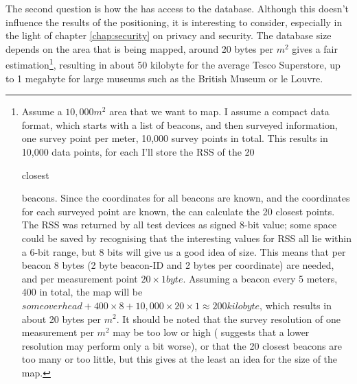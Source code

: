 The second question is how the \device has access to the database.
Although this doesn't influence the results of the positioning, it is interesting to consider, especially in the light of chapter \ref{chap:security} on privacy and security.
The database size depends on the area that is being mapped, around 20 bytes per $m^2$ gives a fair estimation\footnote{Assume a $10,000m^2$ area that we want to map.
    I assume a compact data format, which starts with a list of beacons, and then surveyed information, one survey point per meter, 10,000 survey points in total.
    This results in 10,000 data points, for each I'll store the RSS of the 20 \begin{em}closest\end{em} beacons.
    Since the coordinates for all beacons are known, and the coordinates for each surveyed point are known, the \device can calculate the 20 closest points.
    The RSS was returned by all test devices as signed 8-bit value; some space could be saved by recognising that the interesting values for RSS all lie within a 6-bit range, but 8 bits will give us a good idea of size.
    This means that per beacon 8 bytes (2 byte beacon-ID and 2 bytes per coordinate) are needed, and per measurement point $20 \times 1 byte$.
    Assuming a beacon every 5 meters, 400 in total, the map will be $some overhead + 400 \times 8 + 10,000 \times 20 \times 1 \approx 200 kilobyte$, which results in about 20 bytes per $m^2$.
    It should be noted that the survey resolution of one measurement per $m^2$ may be too low or high (\citet{bahl2000radar} suggests that a lower resolution may perform only a bit worse), or that the 20 closest beacons are too many or too little, but this gives at the least an idea for the size of the map.
}, resulting in about 50 kilobyte for the average Tesco Superstore, up to 1 megabyte for large museums such as the British Museum or le Louvre.

